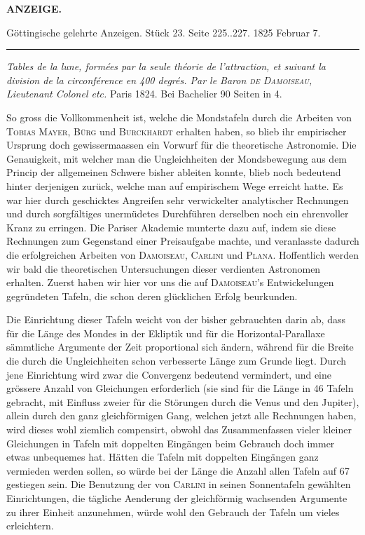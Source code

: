 \clearpage
\begingroup\pagestyle{empty}
\thispagestyle{empty}
\noindent{}%
%
\parbox[t]{\dimexpr\linewidth-24mm\relax}{\centering\scriptsize\bfseries ANZEIGE.}%
\makebox[12mm][r]{}\par\medskip

\begin{center}\small Göttingische gelehrte Anzeigen. Stück 23. Seite 225..227. 1825 Februar 7.\\[3pt]\rule{.72\linewidth}{.3pt}\end{center}

\emph{Tables de la lune, formées par la seule théorie de l'attraction, et suivant la division de la circonférence en \textup{400} degrés. Par le Baron \textup{\textsc{de Damoiseau}}, Lieutenant Colonel etc.} Paris 1824. Bei Bachelier 90 Seiten in 4.

So gross die Vollkommenheit ist, welche die Mondstafeln durch die Arbeiten von \textsc{Tobias Mayer}, \textsc{Bürg} und \textsc{Burckhardt} erhalten haben, so blieb ihr empirischer Ursprung doch gewissermaassen ein Vorwurf für die theoretische Astronomie. Die Genauigkeit, mit welcher man die Ungleichheiten der Mondsbewegung aus dem Princip der allgemeinen Schwere bisher ableiten konnte, blieb noch bedeutend hinter derjenigen zurück, welche man auf empirischem Wege erreicht hatte. Es war hier durch geschicktes Angreifen sehr verwickelter analytischer Rechnungen und durch sorgfältiges unermüdetes Durchführen derselben noch ein ehrenvoller Kranz zu erringen. Die Pariser Akademie munterte dazu auf, indem sie diese Rechnungen zum Gegenstand einer Preisaufgabe machte, und veranlasste dadurch die erfolgreichen Arbeiten von \textsc{Damoiseau}, \textsc{Carlini} und \textsc{Plana}. Hoffentlich werden wir bald die theoretischen Untersuchungen dieser verdienten Astronomen erhalten. Zuerst haben wir hier vor uns die auf \textsc{Damoiseau}'s Entwickelungen gegründeten Tafeln, die schon deren glücklichen Erfolg beurkunden.

Die Einrichtung dieser Tafeln weicht von der bisher gebrauchten darin ab, dass für die Länge des Mondes in der Ekliptik und für die Horizontal-Parallaxe sämmtliche Argumente der Zeit proportional sich ändern, während für die Breite die durch die Ungleichheiten schon verbesserte Länge zum Grunde liegt. Durch jene Einrichtung wird zwar die Convergenz bedeutend vermindert, und eine grössere Anzahl von Gleichungen erforderlich (sie sind für die Länge in 46 Tafeln gebracht, mit Einfluss zweier für die Störungen durch die Venus und den Jupiter), allein durch den ganz gleichförmigen Gang, welchen jetzt alle Rechnungen haben, wird dieses wohl ziemlich compensirt, obwohl das Zusammenfassen vieler kleiner Gleichungen in Tafeln mit doppelten Eingängen beim Gebrauch doch immer etwas unbequemes hat. Hätten die Tafeln mit doppelten Eingängen ganz vermieden werden sollen, so würde bei der Länge die Anzahl allen Tafeln auf 67 gestiegen sein. Die Benutzung der von \textsc{Carlini} in seinen Sonnentafeln gewählten Einrichtungen, die tägliche Aenderung der gleichförmig wachsenden Argumente zu ihrer Einheit anzunehmen, würde wohl den Gebrauch der Tafeln um vieles erleichtern.

